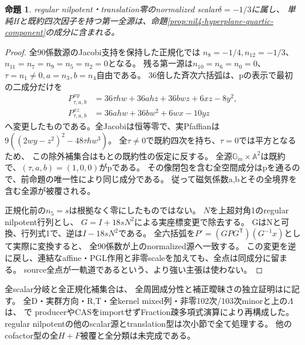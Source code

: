\documentclass[a4paper,11pt]{ltjsarticle}
\newtheorem{proposition}{命題}[section]
\theoremstyle{definition}
\begin{document}
\begin{proposition}\label{prop:nil4-quartic-whole-first-source}
regular nilpotent・translation零のnormalized scalar$\delta=-1/3$に属し、
単純Hと既約四次因子を持つ第一全源は、命題\ref{prop:nil4-hyperplane-quartic-component}の成分に含まれる。
\end{proposition}
\begin{proof}
全90係数源のJacobi支持を保持した正規化では
$n_8=-1/4,n_{12}=-1/3$、$n_{11}=n_7=n_9=n_5=n_2=0$となる。
残る第一源は$n_{10}=n_6=n_0=0$、
$\tau=n_1\ne0,a=n_3,b=n_4$自由である。
36倍した斉次六括弧は、pの表示で最初の二成分だけを
\[
\begin{aligned}
 P^{xy}_{\tau,a,b}&=36\tau hw+36ahz+36bwz+6xz-8y^2,\\
 P^{xz}_{\tau,a,b}&=36ahw+36bw^2+6wx-10yz
\end{aligned}
\]
へ変更したものである。全Jacobiは恒等零で、実Pfaffianは
$9((2wy-z^2)^2-48\tau hw^3)$。
全$\tau\ne0$で既約四次を持ち、$\tau=0$では平方となるため、
この除外補集合はもとの既約性の仮定に反する。
全源$\mathbb G_m\times\mathbb A^2$は既約で、$(\tau,a,b)=(1,0,0)$がpである。
その像閉包を含む全空間成分はpを通るので、前命題の唯一性により同じ成分である。
従って磁気係数a,bとその全境界を含む全源が被覆される。

正規化前の$n_5=s$は根拠なく零にしたものではない。
$N$を上超対角1のregular nilpotent行列とし、
$G=I+18sN^2$による実座標変更で除去する。
GはNと可換、行列式1で、逆は$I-18sN^2$である。
全六括弧を$P'=(GPG^{\mathsf T})(G^{-1}x)$として実際に変換すると、
全90係数が上のnormalized源へ一致する。
この変更を逆に戻し、連結なaffine・PGL作用と非零scaleを加えても、全点は同成分に留まる。
source全点が一軌道であるという、より強い主張は使わない。
\end{proof}
全scalar分岐と全正規化補集合は、
全周囲成分性と補正曖昧さの独立証明はに記す。
全D・実群方向・R,T・全kernel mixed列・非零102次/103次minorと上の$\Lambda$は、
で
producerやCASをimportせずFraction疎多項式演算により再構成した。
regular nilpotentの他のscalar源とtranslation型は次小節で全て処理する。
他のcofactor型の全$H+F$被覆と全分類は未完成である。
\end{document}
